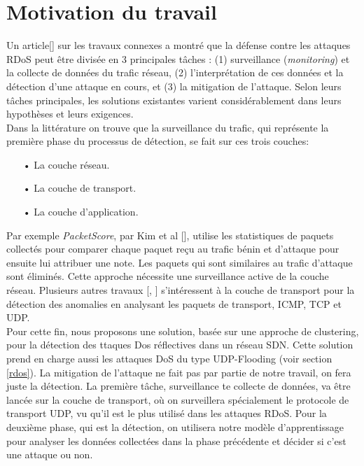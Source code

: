 \section{Motivation du travail}
Un article[\cite{24}] sur les travaux connexes a montré que la défense contre les attaques RDoS peut être divisée en 3 principales tâches : (1) surveillance (\textit{monitoring}) et la collecte de données du trafic réseau, (2) l’interprétation de ces données et la détection d’une attaque en cours, et (3) la mitigation de l’attaque. Selon leurs tâches principales, les solutions existantes varient considérablement dans leurs hypothèses et leurs exigences.\\
Dans la littérature on trouve que la surveillance du trafic, qui représente la première phase du processus de détection, se fait sur ces trois couches:\\
\begin{itemize}
\item[•] La couche réseau.
\item[•] La couche de transport.
\item[•] La couche d'application.\\
\end{itemize}
\newpage
Par exemple \textit{PacketScore}, par Kim et al [\cite{25}], utilise les statistiques de paquets collectés pour comparer chaque paquet reçu au trafic bénin et d’attaque pour ensuite lui attribuer une note. Les paquets qui sont similaires au trafic d’attaque sont éliminés. Cette approche nécessite une surveillance active de la couche réseau. Plusieurs autres travaux [\cite{26}, \cite{27}] s'intéressent à la couche de transport pour la détection des anomalies en analysant les paquets de transport, ICMP, TCP et UDP.\\

Pour cette fin, nous proposons une solution, basée sur une approche de clustering, pour la détection des ttaques Dos réflectives dans un réseau SDN. Cette solution prend en charge aussi les attaques DoS du type UDP-Flooding (voir section \ref{rdos}). La mitigation de l'attaque ne fait pas par partie de notre travail, on fera juste la détection. La première tâche, surveillance te collecte de données, va être lancée sur la couche de transport, où on surveillera spécialement le protocole de transport UDP, vu qu'il est le plus utilisé dans les attaques RDoS. Pour la deuxième phase, qui est la détection, on utilisera notre modèle d'apprentissage pour analyser les données collectées dans la phase précédente et décider si c'est une attaque ou non.

